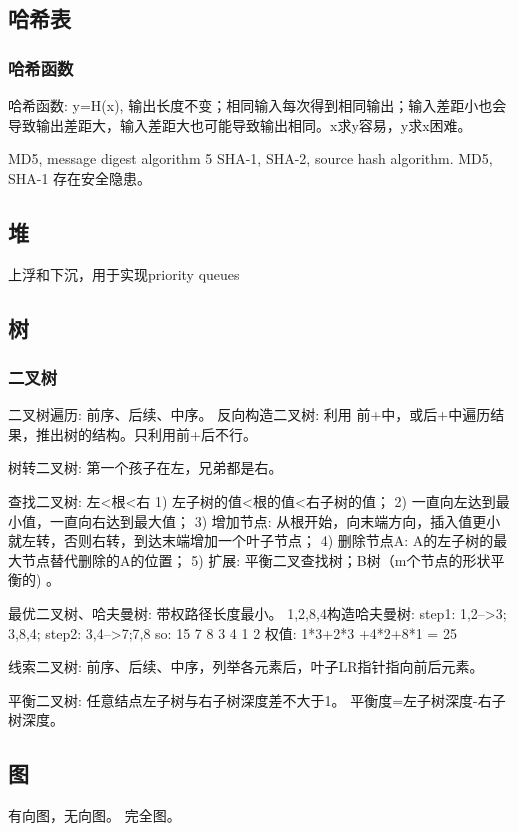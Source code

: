 \documentclass[UTF8]{../computerUniverse}
\begin{document}
\subsection{哈希表}

\subsubsection{哈希函数}
哈希函数: y=H(x), 输出长度不变；相同输入每次得到相同输出；输入差距小也会导致输出差距大，输入差距大也可能导致输出相同。x求y容易，y求x困难。

MD5, message digest algorithm 5
SHA-1, SHA-2, source hash algorithm.
MD5, SHA-1 存在安全隐患。




\subsection{堆}
上浮和下沉，用于实现priority queues


\subsection{树}


\subsubsection{二叉树}

二叉树遍历: 前序、后续、中序。
反向构造二叉树: 利用 前+中，或后+中遍历结果，推出树的结构。只利用前+后不行。

树转二叉树: 第一个孩子在左，兄弟都是右。


查找二叉树: 左<根<右
1) 左子树的值<根的值<右子树的值；
2) 一直向左达到最小值，一直向右达到最大值；
3) 增加节点: 从根开始，向末端方向，插入值更小就左转，否则右转，到达末端增加一个叶子节点；
4) 删除节点A: A的左子树的最大节点替代删除的A的位置；
5) 扩展: 平衡二叉查找树；B树（m个节点的形状平衡的) 。



最优二叉树、哈夫曼树: 带权路径长度最小。 
1,2,8,4构造哈夫曼树: 
step1: 1,2-->3; 3,8,4;
step2: 3,4-->7;7,8
so:        15
      7       8
   3    4
1    2
权值:  1*3+2*3 +4*2+8*1 = 25

线索二叉树: 前序、后续、中序，列举各元素后，叶子LR指针指向前后元素。

平衡二叉树: 
任意结点左子树与右子树深度差不大于1。
平衡度=左子树深度-右子树深度。



\subsection{图}
有向图，无向图。
完全图。
\end{document}
